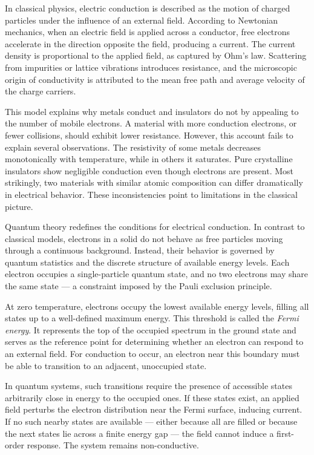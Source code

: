 In classical physics, electric conduction is described as the motion of charged particles under the influence of an external field. According to Newtonian mechanics, when an electric field is applied across a conductor, free electrons accelerate in the direction opposite the field, producing a current. The current density is proportional to the applied field, as captured by Ohm’s law. Scattering from impurities or lattice vibrations introduces resistance, and the microscopic origin of conductivity is attributed to the mean free path and average velocity of the charge carriers.

This model explains why metals conduct and insulators do not by appealing to the number of mobile electrons. A material with more conduction electrons, or fewer collisions, should exhibit lower resistance. However, this account fails to explain several observations. The resistivity of some metals decreases monotonically with temperature, while in others it saturates. Pure crystalline insulators show negligible conduction even though electrons are present. Most strikingly, two materials with similar atomic composition can differ dramatically in electrical behavior. These inconsistencies point to limitations in the classical picture.

Quantum theory redefines the conditions for electrical conduction. In contrast to classical models, electrons in a solid do not behave as free particles moving through a continuous background. Instead, their behavior is governed by quantum statistics and the discrete structure of available energy levels. Each electron occupies a single-particle quantum state, and no two electrons may share the same state — a constraint imposed by the Pauli exclusion principle.

At zero temperature, electrons occupy the lowest available energy levels, filling all states up to a well-defined maximum energy. This threshold is called the \emph{Fermi energy}. It represents the top of the occupied spectrum in the ground state and serves as the reference point for determining whether an electron can respond to an external field. For conduction to occur, an electron near this boundary must be able to transition to an adjacent, unoccupied state.

In quantum systems, such transitions require the presence of accessible states arbitrarily close in energy to the occupied ones. If these states exist, an applied field perturbs the electron distribution near the Fermi surface, inducing current. If no such nearby states are available — either because all are filled or because the next states lie across a finite energy gap — the field cannot induce a first-order response. The system remains non-conductive.

